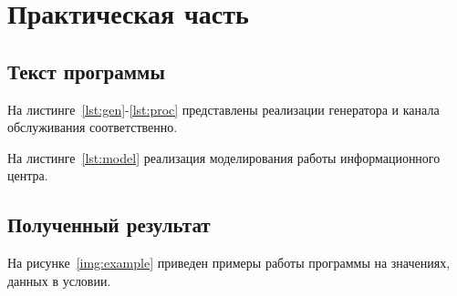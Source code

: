 \chapter{Практическая часть}

\section{Текст программы}

На листинге~\ref{lst:gen}-\ref{lst:proc} представлены реализации генератора и
канала обслуживания соответственно.



На листинге~\ref{lst:model} реализация моделирования работы информационного
центра.


\clearpage
\section{Полученный результат}

На рисунке~\ref{img:example} приведен примеры работы программы на значениях,
данных в условии.


